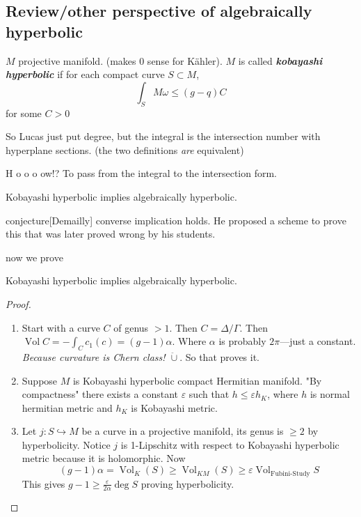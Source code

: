 \subsection{Review/other perspective of algebraically hyperbolic}

\begin{defn}\leavevmode
	$M$ projective manifold. (makes 0 sense for Kähler). $M$ is called \textit{\textbf{kobayashi hyperbolic}} if for each compact curve  $S \subset M$, 
	\[\int_{S}M\omega\leq (g-q)C\]
	for some $C>0$
\end{defn}

\begin{remark}\leavevmode
	So Lucas just put degree, but the integral is the intersection number with hyperplane sections. (the two definitions \textit{are} equivalent)
\end{remark}

\begin{question}\leavevmode
	 H o o o ow!? To pass from the integral to the intersection form.
\end{question}

\begin{thm}[Who?]\leavevmode
Kobayashi hyperbolic implies algebraically hyperbolic.
\end{thm}

\begin{thing4}{conjecture}[Demailly]\leavevmode
	converse implication holds. He proposed a scheme to prove this that was later proved wrong by his students.
\end{thing4}

now we prove

\begin{thm}[Who?]\leavevmode
Kobayashi hyperbolic implies algebraically hyperbolic.
\end{thm}

\begin{proof}\leavevmode
\begin{enumerate}[label=\textbf{Step \arabic*}]
\item Start with a curve $C$ of genus $>1$. Then $C=\Delta/\Gamma$. Then $\operatorname{Vol} C=-\int_{C}c_1(c)=(g-1)\alpha$. Where $\alpha$ is probably $2\pi$---just a constant. \textit{Because curvature is Chern class! $\ddot\cup $}. So that proves it.

\item Suppose $M$ is Kobayashi hyperbolic compact Hermitian manifold. "By compactness" there exists a constant $\varepsilon$ such that $h \leq \varepsilon h_K$, where  $h$ is normal hermitian metric and $h_K$ is Kobayashi metric.

 \item Let $j:S \hookrightarrow M$ be a curve in a projective manifold, its genus is $\geq 2$  by hyperbolicity. Notice $j$ is 1-Lipschitz with respect to Kobayashi hyperbolic metric because it is holomorphic. Now
	 \[(g-1)\alpha=\operatorname{Vol}_{K}(S)\geq \operatorname{Vol}_{KM}(S)\geq \varepsilon\operatorname{Vol}_{\text{Fubini-Study}}S \]
This gives $g-1\geq \frac{\varepsilon}{2 \alpha}\operatorname{deg} S$ proving hyperbolicity. 
\end{enumerate}
\end{proof}

